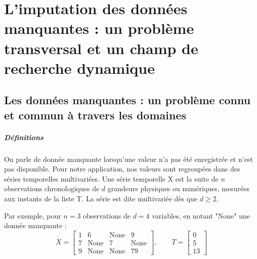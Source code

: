 \chapter{L’imputation des données manquantes : un problème transversal et un champ de recherche dynamique}

\section{Les données manquantes : un problème connu et commun à travers les domaines}



\paragraph{Définitions}
On parle de donnée manquante lorsqu’une valeur n’a pas été enregistrée et n'est pas disponible. %
Pour notre application, nos valeurs sont regroupées dans des séries temporelles multivariées. Une série temporelle \gls{X} est la suite de $n$ observations chronologiques de $d$ grandeurs physiques ou numériques, mesurées aux instants de la liste \gls{T}. 
La série est dite multivariée dès que $d \ge 2$. 

Par exemple, pour $n=3$ observations de $d=4$ variables, en notant "None" une donnée manquante :
\begin{equation}
X = \begin{bmatrix}
1 & 6 & \mathrm{None} & 9 \\
7 & \mathrm{None} & 7 & \mathrm{None} \\
9 & \mathrm{None} & \mathrm{None} & 79
\end{bmatrix},
\qquad
T = \begin{bmatrix} 0 \\ 5 \\ 13 \end{bmatrix}
\label{eq:exemple_X}
\end{equation}



